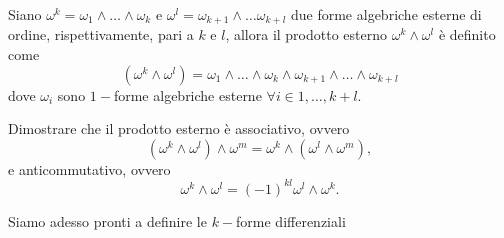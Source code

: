 \begin{definition}
    Siano $\omega^k = \omega_1 \wedge \ldots \wedge \omega_k$ e $\omega^l = \omega_{k+1} \wedge \ldots \omega_{k+l}$ due forme algebriche esterne di ordine, rispettivamente, pari a $k$ e $l$, allora il prodotto esterno $\omega^k \wedge \omega^l$ è definito come
    $$
        (\omega^k \wedge \omega^l) =  \omega_1 \wedge \ldots \wedge \omega_k \wedge \omega_{k+1} \wedge \ldots \wedge \omega_{k+l}
    $$
    dove $\omega_i$ sono $1-$forme algebriche esterne $\forall i \in {1, \ldots, k+l}$.
\end{definition}
\begin{exercise}
    Dimostrare che il prodotto esterno è associativo, ovvero
    $$
        (\omega^k \wedge \omega^l) \wedge \omega^m = \omega^k \wedge (\omega^l \wedge \omega^m),
    $$
    e anticommutativo, ovvero
    $$
        \omega^k \wedge \omega^l = (-1) ^ {kl} \omega^l \wedge \omega^k.
    $$
\end{exercise}
Siamo adesso pronti a definire le $k-$forme differenziali
